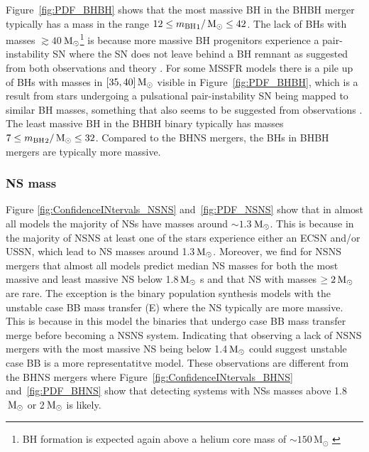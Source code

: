 \documentclass[twocolumn]{aastex63}
\newcommand\bhnsSingle{BHNS\xspace}
\newcommand{\Msun}{\ensuremath{\,\rm{M}_{\odot}}\xspace}
\newcommand{\mbhf}{\ensuremath{m_{\rm{BH}}}\xspace}
\begin{document}
 Figure~\ref{fig:PDF_BHBH} shows that the most massive BH in the \ac{BHBH} merger typically has a mass in the range $ 12 \leq {\mbhf}_1/\Msun \leq  42$. The lack of \acp{BH} with masses $\gtrsim 40$\Msun\footnote{\ac{BH} formation is expected again above a helium core mass of $\sim 150$\,M$_\odot$ \citep{Woosley2002TheStars,Woosley2019TheLoss}} is because more massive \ac{BH} progenitors experience a pair-instability \ac{SN} where the \ac{SN} does not leave behind a \ac{BH} remnant as suggested from both observations \citep{2017ApJ...851L..25F,2018ApJ...856..173T,2019PhRvX...9c1040A, 2019PhRvD.100d3012W, 2019MNRAS.484.4216R,2019arXiv191209708G} and theory \citep{1964ApJS....9..201F,1967PhRvL..18..379B,2017ApJ...836..244W}.
  For some \ac{MSSFR} models there is a pile up of \acp{BH} with masses in $[35, 40]\Msun$ visible in  Figure~\ref{fig:PDF_BHBH}, which is a result from stars undergoing a pulsational pair-instability SN being mapped to similar \ac{BH} masses, something that also seems to be suggested from observations \citep{2018ApJ...856..173T,2019PhRvX...9c1040A}. The least massive BH in the \ac{BHBH} binary typically has masses $ 7 \leq {\mbhf}_2/\Msun \leq 32$. Compared to the \bhnsSingle mergers, 
the \acp{BH} in \ac{BHBH} mergers are typically  more massive. 




%



\subsubsection{NS mass}
Figure \ref{fig:ConfidenceINtervals_NSNS} and~\ref{fig:PDF_NSNS} show that in almost all models the majority of \acp{NS} have masses around $\sim 1.3$\Msun. This is because in  the majority of \ac{NSNS} at least one of the stars experience either an \ac{ECSN} and/or \ac{USSN}, which  lead to \ac{NS} masses around 1.3\Msun  \citep[e.g.,][]{2017ApJ...846..170T,2018MNRAS.481.4009V}. 
Moreover, we find for \ac{NSNS} mergers that almost all models predict median \ac{NS} masses for both the most massive and least massive \ac{NS} below 1.8\Msun s and that \ac{NS} with masses $\geq 2\Msun$ are rare. The exception  is the binary population synthesis models with the unstable case BB mass transfer  (E) where the \ac{NS} typically are more massive.   This is because in this model the binaries that undergo case BB mass transfer merge before becoming a \ac{NSNS} system. Indicating that observing a lack of \ac{NSNS} mergers with the most massive \ac{NS} being below 1.4\Msun could suggest unstable case BB is a more representatitve model.  These observations are different from the \bhnsSingle mergers where Figure~\ref{fig:ConfidenceINtervals_BHNS} and~\ref{fig:PDF_BHNS} show that detecting systems with \acp{NS} masses above 1.8\Msun or 2\Msun is likely. 
\end{document}
